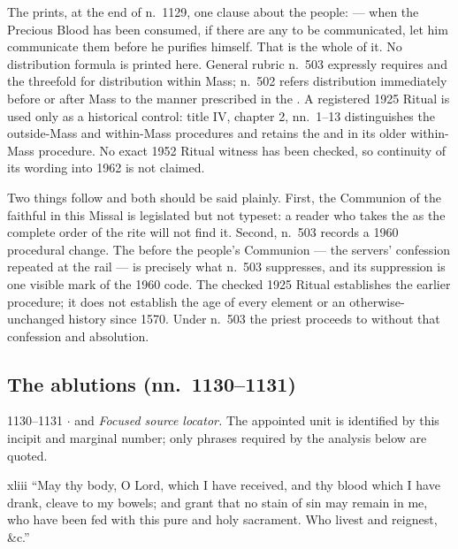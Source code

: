 The  prints, at the end of n.~1129, one clause about the
people:  --- when the Precious Blood has been consumed, if there
are any to be communicated, let him communicate them before he purifies himself.
That is the whole of it. No distribution formula is printed here. General
rubric n.~503 expressly requires  and the threefold
 for distribution within Mass; n.~502 refers
distribution immediately before or after Mass to the manner prescribed in the
. A registered 1925 Ritual is used only as a historical
control: title IV, chapter 2, nn.~1--13 distinguishes the outside-Mass and
within-Mass procedures and retains the  and
 in its older within-Mass procedure. No exact 1952 Ritual
witness has been checked, so continuity of its wording into 1962 is not claimed.

Two things follow and both should be said plainly. First, the Communion of the
faithful in this Missal is legislated but not typeset: a reader who takes the
 as the complete order of the rite will not find it. Second,
n.~503 records a 1960 procedural change. The
 before the people's Communion --- the servers' confession
repeated at the rail --- is precisely what n.~503 suppresses, and its
suppression is one visible mark of the 1960 code. The checked 1925 Ritual
establishes the earlier procedure; it does not establish the age of every
element or an otherwise-unchanged history since 1570. Under n.~503 the priest
proceeds to  without that confession and absolution.

\subsection*{The ablutions (nn.~1130--1131)}

\begin{appointed}{1130--1131 $\cdot$  and }
\textit{Focused source locator.} The appointed unit is identified by this incipit and marginal number; only phrases required by the analysis below are quoted.
\end{appointed}

\begin{englishwitness}{xliii}
``May thy body, O Lord, which I have received, and thy blood which I have
drank, cleave to my bowels; and grant that no stain of sin may remain in me,
who have been fed with this pure and holy sacrament. Who livest and reignest,
\&c.''
\end{englishwitness}

